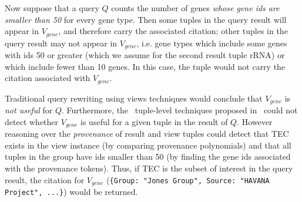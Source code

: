 
Now suppose that a query $Q$ counts the number of genes \textit{whose gene ids are smaller than 50} for every gene type. Then some tuples in the query result will appear in $V_{gene}$, and therefore carry the associated citation;  other tuples in the query result may not appear in $V_{gene}$, i.e. gene types which include some genes with ids 50 or greater (which we assume for the second result tuple rRNA)  or which include fewer than 10 genes.  In this case, the tuple would not carry the citation associated with $V_{gene}$.

Traditional query rewriting using views techniques would conclude that $V_{gene}$ is {\em not useful} for $Q$.  Furthermore, the \rba\ tuple-level techniques proposed in~\cite{wu2018data} could not detect whether $V_{gene}$ is useful for a given tuple in the result of $Q$.
However reasoning over the {\em provenance} of result  and view tuples could detect that TEC exists in the view instance (by comparing provenance polynomials) and that all tuples in the group have ids smaller than 50 (by finding the gene ids associated with the provenance tokens).  Thus, if TEC is the subset of interest in the query result, the citation for $V_{gene}$ ({\tt \{Group: "Jones Group", Source: "HAVANA Project", ...\}}) would be returned.


